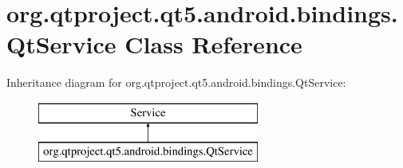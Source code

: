 \hypertarget{classorg_1_1qtproject_1_1qt5_1_1android_1_1bindings_1_1_qt_service}{}\section{org.\+qtproject.\+qt5.\+android.\+bindings.\+Qt\+Service Class Reference}
\label{classorg_1_1qtproject_1_1qt5_1_1android_1_1bindings_1_1_qt_service}
Inheritance diagram for org.\+qtproject.\+qt5.\+android.\+bindings.\+Qt\+Service\+:\begin{figure}[H]
\begin{center}
\leavevmode
\includegraphics[height=2.000000cm]{classorg_1_1qtproject_1_1qt5_1_1android_1_1bindings_1_1_qt_service}
\end{center}
\end{figure}
